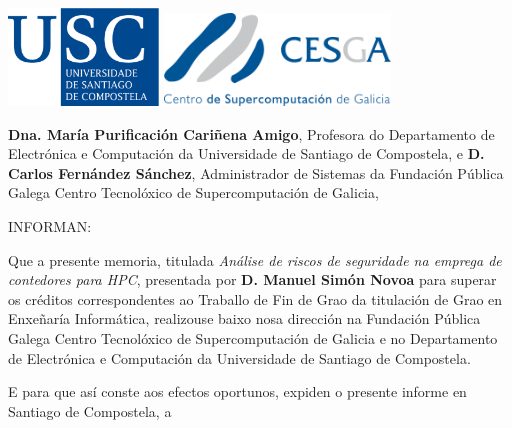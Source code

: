 \pagestyle{plain}
\includegraphics[width=4cm]{figuras/logo_usc.eps}
\hspace{3.5cm}
\includegraphics[width=6cm]{figuras/logo_cesga}

\vspace{1cm}
{\bf Dna. María Purificación Cariñena Amigo}, Profesora do Departamento de Electrónica e Computación da Universidade de Santiago de Compostela, e {\bf D. Carlos Fernández Sánchez}, Administrador de Sistemas da Fundación Pública Galega Centro Tecnolóxico de Supercomputación de Galicia, 

\vspace{1cm}
INFORMAN:

\vspace{1cm}
Que a presente memoria, titulada {\it Análise de riscos de seguridade na emprega de contedores para HPC}, presentada por {\bf D. Manuel Simón Novoa} para superar os créditos correspondentes ao Traballo de Fin de Grao da titulación de Grao en Enxeñaría Informática, realizouse baixo nosa dirección na Fundación Pública Galega Centro Tecnolóxico de Supercomputación de Galicia e no Departamento de Electrónica e Computación da Universidade de Santiago de Compostela.

\vspace{1cm}
E para que así conste aos efectos oportunos, expiden o presente informe en Santiago de Compostela, a

\vspace{2cm}

